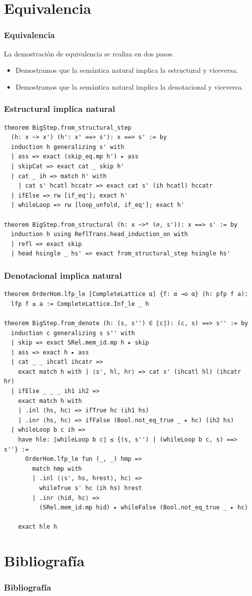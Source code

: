\documentclass[9pt]{beamer}
\begin{document}
\section{Equivalencia}


\begin{frame}[fragile]
\frametitle{Equivalencia}

La demostración de equivalencia se realiza en dos pasos.
\begin{itemize}
    \item Demostramos que la semántica natural implica la estructural y viceversa.
    \item Demostramos que la semántica natural implica la denotacional y viceversa.
\end{itemize}

\end{frame}

\begin{frame}[fragile]
\frametitle{Estructural implica natural}
\begin{verbatim}
theorem BigStep.from_structural_step
  (h: x ~> x') (h': x' ==> s'): x ==> s' := by
  induction h generalizing s' with
  | ass => exact (skip_eq.mp h') ▸ ass
  | skipCat => exact cat _ skip h'
  | cat _ ih => match h' with
    | cat s' hcatl hccatr => exact cat s' (ih hcatl) hccatr
  | ifElse => rw [if_eq']; exact h'
  | whileLoop => rw [loop_unfold, if_eq']; exact h'

theorem BigStep.from_structural (h: x ~>* (∅, s')): x ==> s' := by
  induction h using ReflTrans.head_induction_on with
  | refl => exact skip
  | head hsingle _ hs' => exact from_structural_step hsingle hs'
\end{verbatim}
\end{frame}

\begin{frame}[fragile]
\frametitle{Denotacional implica natural}
\begin{verbatim}
theorem OrderHom.lfp_le [CompleteLattice α] {f: α →o α} (h: pfp f a):
  lfp f ≤ a := CompleteLattice.Inf_le _ h

theorem BigStep.from_denote (h: (s, s'') ∈ ⟦c⟧): (c, s) ==> s'' := by
  induction c generalizing s s'' with
  | skip => exact SRel.mem_id.mp h ▸ skip
  | ass => exact h ▸ ass
  | cat _ _ ihcatl ihcatr =>
    exact match h with | ⟨s', hl, hr⟩ => cat s' (ihcatl hl) (ihcatr hr)
  | ifElse _ _ _ ih1 ih2 =>
    exact match h with
    | .inl ⟨hs, hc⟩ => ifTrue hc (ih1 hs)
    | .inr ⟨hs, hc⟩ => ifFalse (Bool.not_eq_true _ ▸ hc) (ih2 hs)
  | whileLoop b c ih =>
    have hle: ⟦whileLoop b c⟧ ≤ {(s, s'') | (whileLoop b c, s) ==> s''} :=
      OrderHom.lfp_le fun (_, _) hmp =>
        match hmp with
        | .inl ⟨⟨s', hs, hrest⟩, hc⟩ =>
          whileTrue s' hc (ih hs) hrest
        | .inr ⟨hid, hc⟩ =>
          (SRel.mem_id.mp hid) ▸ whileFalse (Bool.not_eq_true _ ▸ hc)

    exact hle h
\end{verbatim}
\end{frame}

\section{Bibliografía}

\begin{frame}
\frametitle{Bibliografía}


\end{frame}
\end{document}
